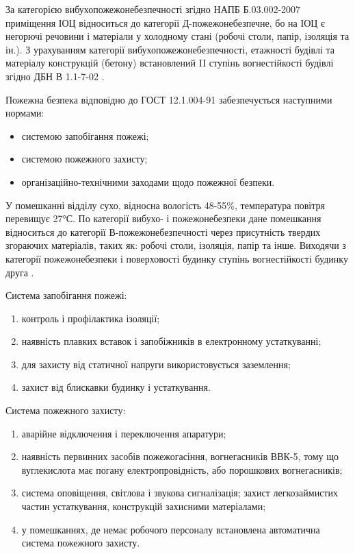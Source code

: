 За категорією вибухопожежонебезпечності згідно НАПБ Б.03.002-2007 \cite{ber11} приміщення ІОЦ відноситься до категорії Д-пожежонебезпечне, бо на ІОЦ є негорючі речовини і матеріали у холодному стані (робочі столи, папір, ізоляція та ін.). З урахуванням категорії вибухопожежонебезпечності, етажності будівлі та матеріалу конструкцій (бетону) встановлений II ступінь вогнестійкості будівлі згідно ДБН В 1.1-7-02 \cite{ber12}.

Пожежна безпека відповідно до ГОСТ 12.1.004-91 \cite{ber13}  забезпечується наступними нормами:
\begin{itemize}
\item системою запобігання пожежі;
\item системою пожежного захисту;
\item організаційно-технічними заходами щодо пожежної безпеки.
\end{itemize}

У помешканні відділу сухо, відносна вологість 48-55\%, температура повітря перевищує 27°С. По категорії вибухо- і пожежонебезпеки дане помешкання відноситься до категорії В-пожежонебезпечності через присутність твердих згораючих матеріалів, таких як: робочі столи, ізоляція, папір та інше. Виходячи з категорії пожежонебезпеки і поверховості будинку ступінь вогнестійкості будинку друга \cite{ber14}.

Система запобігання пожежі:
\begin{enumerate}
\item контроль і профілактика ізоляції;
\item наявність плавких вставок і запобіжників в електронному устаткуванні;
\item для захисту від статичної напруги використовується заземлення;
\item захист від блискавки будинку і устаткування.
\end{enumerate}

Система пожежного захисту:
\begin{enumerate}
\item аварійне відключення і переключення апаратури; 
\item наявність первинних засобів пожежогасіння, вогнегасників ВВК-5, тому що вуглекислота має погану електропровідність, або порошкових вогнегасників;
\item система оповіщення, світлова і звукова сигналізація; захист легкозаймистих частин устаткування, конструкцій захисними матеріалами;
\item у помешканнях, де немає робочого персоналу встановлена автоматична система пожежного захисту.
\end{enumerate}


